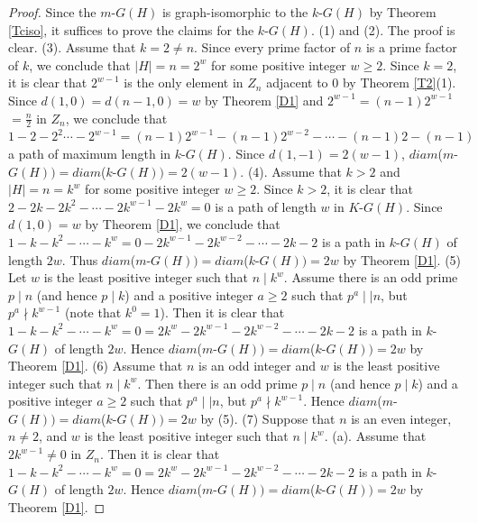 \documentclass{amsart}
\theoremstyle{plain}
\begin{document}
		\begin{proof} Since the $m$-$G(H)$ is graph-isomorphic to the $k$-$G(H)$ by Theorem \ref{Tciso}, it suffices to prove the claims for the $k$-$G(H)$.
			\newline
		(1) and (2). The proof is clear.
			\newline
			(3). Assume that $k = 2 \not = n$. Since every prime factor of $n$ is a prime factor of $k$, we conclude that $|H| = n = 2^w$ for some positive integer $w \geq 2$. Since $k = 2$, it is clear that $2^{w-1}$ is the only element in $Z_n$  adjacent to $0$ by Theorem \ref{T2}(1). Since $d(1, 0) = d(n - 1, 0) = w$ by Theorem \ref{D1} and $2^{w-1} = (n-1)2^{w-1}$ $= \frac{n}{2}$ in $Z_n$, we conclude that $1-2-2^2\cdots -2^{w-1} = (n-1)2^{w-1}-(n-1)2^{w-2}-\cdots-(n-1)2-(n-1)$ a path of maximum length in $k$-$G(H)$. Since $d(1, -1) = 2(w-1)$,   $diam$($m$-$G(H)) = diam$($k$-$G(H)) = 2(w - 1)$.
			\newline
			(4). Assume that  $k >  2$ and $|H| = n = k^w$ for some positive integer $w \geq 2$. Since $k > 2$, it is clear that $2-2k-2k^2-\cdots -2k^{w-1}-2k^w = 0$ is a path of length $w$ in $K$-$G(H)$. Since $d(1, 0) = w$ by Theorem \ref{D1}, we conclude that $1-k-k^2-\cdots - k^w=0-2k^{w-1}-2k^{w-2}-\cdots -2k-2$ is a path in $k$-$G(H)$ of length $2w$. Thus $diam$($m$-$G(H)) = diam$($k$-$G(H)) = 2w$ by Theorem \ref{D1}.
			\newline
			(5) Let $w$ is the least positive integer such that $n \mid k^w$. Assume there is an odd prime $p \mid n$ (and hence $p \mid k$) and a positive integer $a\geq 2$ such that $p^a\mid \mid n$, but $p^a \nmid k^{w-1}$ (note that $k^0 = 1$). Then it is clear that $1-k-k^2-\cdots - k^w=0=2k^w-2k^{w-1}-2k^{w-2}-\cdots -2k-2$ is a path in $k$-$G(H)$ of length $2w$. Hence $diam$($m$-$G(H)) = diam$($k$-$G(H)) = 2w$ by Theorem \ref{D1}.
			\newline
			(6) Assume that $n$ is an odd integer and $w$ is the least positive integer such that $n \mid k^w$. Then there  is an odd prime $p \mid n$ (and hence $p \mid k$) and a positive integer $a\geq 2$ such that $p^a \mid\mid n$, but $p^a \nmid k^{w-1}$. Hence $diam$($m$-$G(H)) = diam$($k$-$G(H)) = 2w$ by (5).
			\newline
			(7) Suppose that $n$ is an even integer, $n\not = 2$, and $w$ is the least positive integer such that $n \mid k^w$.
			\newline
				(a). Assume that $2k^{w-1} \not = 0$ in $Z_n$. Then it is clear that $1-k-k^2-\cdots - k^w=0=2k^w-2k^{w-1}-2k^{w-2}-\cdots -2k-2$ is a path in $k$-$G(H)$ of length $2w$. Hence $diam$($m$-$G(H)) = diam$($k$-$G(H)) = 2w$ by Theorem \ref{D1}.

\end{proof}
\end{document}
